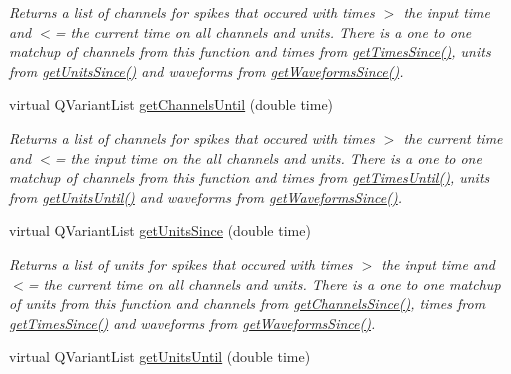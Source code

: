 \begin{DoxyCompactItemize}
\begin{DoxyCompactList}\small\item\em Returns a list of channels for spikes that occured with times $>$ the input time and $<$= the current time on all channels and units. There is a one to one matchup of channels from this function and times from \hyperlink{class_picto_1_1_live_spike_reader_adf4156ef2c32edfee42a7a82a63b0808}{get\-Times\-Since()}, units from \hyperlink{class_picto_1_1_live_spike_reader_a534fac19991435569beae1d2abda0446}{get\-Units\-Since()} and waveforms from \hyperlink{class_picto_1_1_live_spike_reader_a177e75e33b122f46f6836ca2b04d2ea0}{get\-Waveforms\-Since()}. \end{DoxyCompactList}\item 
\hypertarget{class_picto_1_1_live_spike_reader_a8068875b5d7ff0785ba6e21e2b947681}{virtual Q\-Variant\-List \hyperlink{class_picto_1_1_live_spike_reader_a8068875b5d7ff0785ba6e21e2b947681}{get\-Channels\-Until} (double time)}\label{class_picto_1_1_live_spike_reader_a8068875b5d7ff0785ba6e21e2b947681}

\begin{DoxyCompactList}\small\item\em Returns a list of channels for spikes that occured with times $>$ the current time and $<$= the input time on the all channels and units. There is a one to one matchup of channels from this function and times from \hyperlink{class_picto_1_1_live_spike_reader_af76447878e8fcf2d18b92a7739baed80}{get\-Times\-Until()}, units from \hyperlink{class_picto_1_1_live_spike_reader_ad285c7f58f3d0e910a969ae351da6198}{get\-Units\-Until()} and waveforms from \hyperlink{class_picto_1_1_live_spike_reader_a177e75e33b122f46f6836ca2b04d2ea0}{get\-Waveforms\-Since()}. \end{DoxyCompactList}\item 
\hypertarget{class_picto_1_1_live_spike_reader_a534fac19991435569beae1d2abda0446}{virtual Q\-Variant\-List \hyperlink{class_picto_1_1_live_spike_reader_a534fac19991435569beae1d2abda0446}{get\-Units\-Since} (double time)}\label{class_picto_1_1_live_spike_reader_a534fac19991435569beae1d2abda0446}

\begin{DoxyCompactList}\small\item\em Returns a list of units for spikes that occured with times $>$ the input time and $<$= the current time on all channels and units. There is a one to one matchup of units from this function and channels from \hyperlink{class_picto_1_1_live_spike_reader_aa5b2f11f42b9d6a946ca1a8123aa0bc1}{get\-Channels\-Since()}, times from \hyperlink{class_picto_1_1_live_spike_reader_adf4156ef2c32edfee42a7a82a63b0808}{get\-Times\-Since()} and waveforms from \hyperlink{class_picto_1_1_live_spike_reader_a177e75e33b122f46f6836ca2b04d2ea0}{get\-Waveforms\-Since()}. \end{DoxyCompactList}\item 
\hypertarget{class_picto_1_1_live_spike_reader_ad285c7f58f3d0e910a969ae351da6198}{virtual Q\-Variant\-List \hyperlink{class_picto_1_1_live_spike_reader_ad285c7f58f3d0e910a969ae351da6198}{get\-Units\-Until} (double time)}\label{class_picto_1_1_live_spike_reader_ad285c7f58f3d0e910a969ae351da6198}


\end{DoxyCompactItemize}
